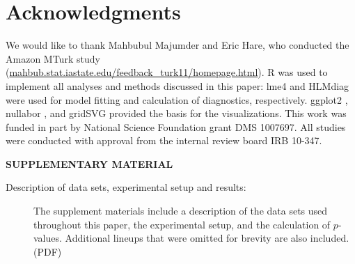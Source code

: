 \documentclass[12pt]{article}
\newcommand{\hh}[1]{{\color{orange} #1}}
\newcommand{\alnote}[1]{\todo[inline,color=green!40]{#1}} %
\begin{document}


\section{Acknowledgments}
We would like to thank Mahbubul Majumder and Eric Hare, who conducted the Amazon MTurk study (\url{mahbub.stat.iastate.edu/feedback_turk11/homepage.html}). R \citep{R} was used to implement all analyses and methods discussed in this paper: lme4 \citep{lme4, lme4b} and HLMdiag \citep{HLMDiag, Loy:JSS} were used for model fitting and  calculation of diagnostics, respectively.  ggplot2 \citep{ggplot2}, nullabor \citep{nullabor}, and gridSVG \citep{gridSVG} provided the basis for the visualizations.
This work was funded in part by National Science Foundation grant DMS 1007697. All studies were conducted with approval from the internal review board IRB 10-347.


\bigskip
\begin{center}
{\large\bf SUPPLEMENTARY MATERIAL}
\end{center}

\begin{description}

\item[Description of data sets, experimental setup and results:] The supplement materials include a description of the data sets used throughout this paper, the experimental setup, and the calculation of $p$-values. Additional lineups that were omitted for brevity are also included. (PDF)

\end{description}
\end{document}
